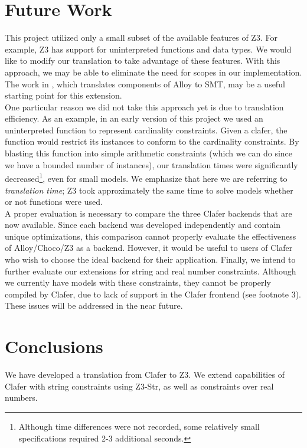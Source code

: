 \documentclass{easychair}
\begin{document}
\section{Future Work}
This project utilized only a small subset of the available features of Z3. For example, Z3 has support for uninterpreted functions and data types. We would like to modify our translation to take advantage of these features. With this approach, we may be able to eliminate the need for scopes in our implementation. The work in \cite{Mana}, which translates components of Alloy to SMT, may be a useful starting point for this extension.\\
\indent One particular reason we did not take this approach yet is due to translation efficiency. As an example, in an early version of this project we used an uninterpreted function to represent cardinality constraints. Given a clafer, the function would restrict its instances to conform to the cardinality constraints. By blasting this function into simple arithmetic constraints (which we can do since we have a bounded number of instances), our translation times were significantly decreased\footnote{Although time differences were not recorded, some relatively small specifications required 2-3 additional seconds.}, even for small models. We emphasize that here we are referring to \textit{translation time}; Z3 took approximately the same time to solve models whether or not functions were used.\\
\indent A proper evaluation is necessary to compare the three Clafer backends that are now available. Since each backend was developed independently and contain unique optimizations, this comparison cannot properly evaluate the effectiveness of Alloy/Choco/Z3 as a backend. However, it would be useful to users of Clafer who wish to choose the ideal backend for their application. 
\indent Finally, we intend to further evaluate our extensions for string and real number constraints. Although we currently have models with these constraints, they cannot be properly compiled by Clafer, due to lack of support in the Clafer frontend (see footnote 3). These issues will be addressed in the near future. 

\section{Conclusions}
We have developed a translation from Clafer to Z3. We extend capabilities of Clafer with string constraints using Z3-Str, as well as constraints over real numbers.





\end{document}
